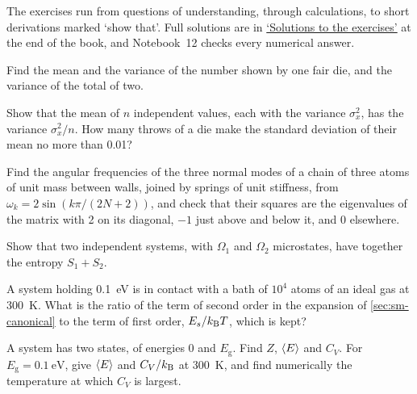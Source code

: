 \label{sec:sm-exercises}

The exercises run from questions of understanding, through calculations,
to short derivations marked `show that'. Full solutions are in
\hyperref[sec:sm-solutions]{`Solutions to the exercises'} at the end of
the book, and Notebook~12 checks every numerical answer.

\begin{exercise}
\label{ex:sm-die}
Find the mean and the variance of the number shown by one fair die, and
the variance of the total of two.
\end{exercise}

\begin{exercise}
\label{ex:sm-mean}
Show that the mean of $n$ independent values, each with the variance
$\sigma_x^2$, has the variance $\sigma_x^2/n$. How many throws of a die
make the standard deviation of their mean no more than 0.01?
\end{exercise}

\begin{exercise}
\label{ex:sm-chain}
Find the angular frequencies of the three normal modes of a chain of
three atoms of unit mass between walls, joined by springs of unit
stiffness, from $\omega_k = 2\sin(k\pi/(2N + 2))$, and check that their
squares are the eigenvalues of the matrix with 2 on its diagonal, $-1$
just above and below it, and 0 elsewhere.
\end{exercise}

\begin{exercise}
\label{ex:sm-additive}
Show that two independent systems, with $\Omega_1$ and $\Omega_2$
microstates, have together the entropy $S_1 + S_2$.
\end{exercise}

\begin{exercise}
\label{ex:sm-bath}
A system holding \SI{0.1}{\electronvolt} is in contact with a bath of
$10^4$ atoms of an ideal gas at \SI{300}{\kelvin}. What is the ratio of
the term of second order in the expansion of \cref{sec:sm-canonical} to
the term of first order, $E_s/k_{\mathrm{B}} T$, which is kept?
\end{exercise}

\begin{exercise}
\label{ex:sm-two-level}
A system has two states, of energies 0 and $E_{\mathrm g}$. Find $Z$,
$\langle E \rangle$ and $C_V$. For $E_{\mathrm g} = \SI{0.1}{\electronvolt}$, give
$\langle E \rangle$ and $C_V/k_{\mathrm{B}}$ at \SI{300}{\kelvin}, and find numerically the
temperature at which $C_V$ is largest.
\end{exercise}

